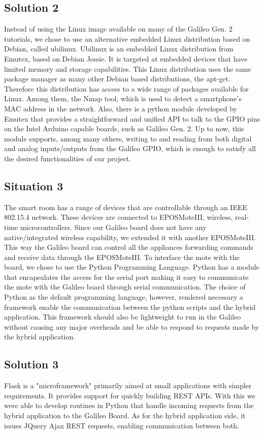 \documentclass[12pt]{partialreport}
\begin{document}
\subsection*{Solution 2}
Instead of using the Linux image available on many of the Galileo Gen. 2 tutorials, we chose to use an alternative embedded Linux distribution based on Debian, called ubilinux. Ubilinux is an embedded Linux distribution from Emutex, based on Debian Jessie. It is targeted at embedded devices that have limited memory and storage capabilities. This Linux distribution uses the same package manager as many other Debian based distributions, the apt-get. Therefore this distribution has access to a wide range of packages available for Linux. Among them, the Nmap tool, which is used to detect a smartphone's MAC address in the network.
Also, there is a python module developed by Emutex that provides a straightforward and unified API to talk to the GPIO pins on the Intel Arduino capable boards, such as Galileo Gen. 2. Up to now, this module supports, among many others, writing to and reading from both digital and analog inputs/outputs from the Galileo GPIO, which is enough to satisfy all the desired functionalities of our project.

\subsection*{Situation 3}
The smart room has a range of devices that are controllable through an IEEE 802.15.4 network. These devices are connected to EPOSMoteIII, wireless, real-time microcontrollers. Since our Galileo board does not have any native/integrated wireless capability, we extended it with another EPOSMoteIII. This way the Galileo board can control all the appliances forwarding commands and receive data through the EPOSMoteIII. To interface the mote with the board, we chose to use the Python Programming Language. Python has a module that encapsulates the access for the serial port making it easy to communicate the mote with the Galileo board through serial communication. The choice of Python as the default programming language, however, rendered necessary a framework enable the communication between the python scripts and the hybrid application. This framework should also be lightweight to run in the Galileo without causing any major overheads and be able to respond to requests made by the hybrid application.
\subsection*{Solution 3}
Flask is a "microframework" primarily aimed at small applications with simpler requirements. It provides support for quickly building REST APIs. With this we were able to develop routines in Python that handle incoming requests from the hybrid application to the Galileo Board. As for the hybrid application side, it issues JQuery Ajax REST requests, enabling communication between both.
\end{document}
